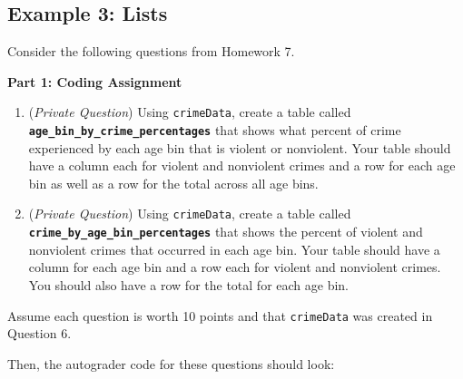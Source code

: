 \documentclass[
  12pt,
]{book}
\begin{document}
\subsection*{Example 3: Lists}\label{example-3-lists}

Consider the following questions from Homework 7.

\textbf{Part 1: Coding Assignment}

\begin{enumerate}
\def\labelenumi{\arabic{enumi}.}
\setcounter{enumi}{7}
\item
  (\emph{Private Question}) Using \texttt{crimeData}, create a table called \textbf{\texttt{age\_bin\_by\_crime\_percentages}} that shows what percent of crime experienced by each age bin that is violent or nonviolent. Your table should have a column each for violent and nonviolent crimes and a row for each age bin as well as a row for the total across all age bins.
\item
  (\emph{Private Question}) Using \texttt{crimeData}, create a table called \textbf{\texttt{crime\_by\_age\_bin\_percentages}} that shows the percent of violent and nonviolent crimes that occurred in each age bin. Your table should have a column for each age bin and a row each for violent and nonviolent crimes. You should also have a row for the total for each age bin.
\end{enumerate}

Assume each question is worth 10 points and that \texttt{crimeData} was created in Question 6.

Then, the autograder code for these questions should look:
\end{document}
